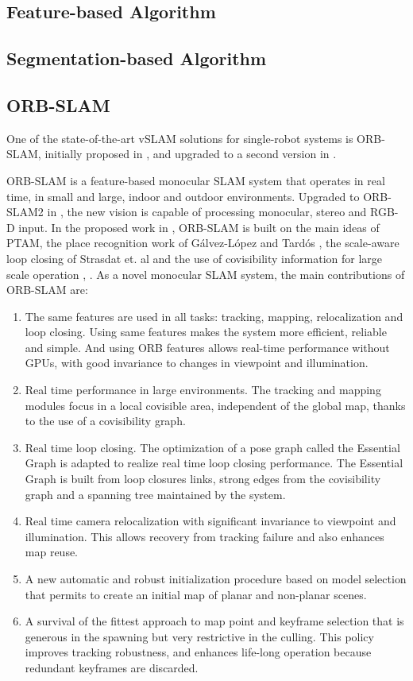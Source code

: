\subsection{Feature-based Algorithm}

\subsection{Segmentation-based Algorithm}

\subsection{ORB-SLAM}
\label{chp:orbslam}
One of the state-of-the-art vSLAM solutions for single-robot systems is ORB-SLAM, initially proposed in \cite{mur2015orb}, and upgraded to a second version in \cite{mur2017orb}.

ORB-SLAM is a feature-based monocular SLAM system that operates in real time, in small and large, indoor and outdoor environments. Upgraded to ORB-SLAM2 in \cite{mur2017orb}, the new vision is capable of processing monocular, stereo and RGB-D input. In the proposed work in \cite{mur2015orb}, ORB-SLAM is built on the main ideas of PTAM, the place recognition work of G\'alvez-L\'opez and Tard\'os \cite{galvez2012bags}, the scale-aware loop closing of Strasdat et. al \cite{strasdat2010scale} and the use of covisibility information for large scale operation \cite{strasdat2011double}, \cite{mei2010closing}. As a novel monocular SLAM system, the main contributions of ORB-SLAM are:
\begin{enumerate}[1.]
	\item The same features are used in all tasks: tracking, mapping, relocalization and loop closing. Using same features makes the system more efficient, reliable and simple. And using ORB features allows real-time performance without GPUs, with good invariance to changes in viewpoint and illumination.
	\item Real time performance in large environments. The tracking and mapping modules focus in a local covisible area, independent of the global map, thanks to the use of a covisibility graph.
	\item Real time loop closing. The optimization of a pose graph called the Essential Graph is adapted to realize real time loop closing performance. The Essential Graph is built from loop closures links, strong edges from the covisibility graph and a spanning tree maintained by the system.
	\item Real time camera relocalization with significant invariance to viewpoint and illumination. This allows recovery from tracking failure and also enhances map reuse.
	\item A new automatic and robust initialization procedure based on model selection that permits to create an initial map of planar and non-planar scenes.
	\item A survival of the fittest approach to map point and keyframe selection that is generous in the spawning but very restrictive in the culling. This policy improves tracking robustness, and enhances life-long operation because redundant keyframes are discarded.
\end{enumerate}

